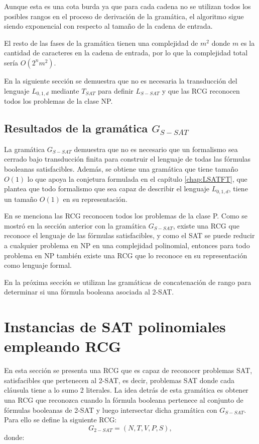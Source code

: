 \documentclass[12pt]{article}
\begin{document}
Aunque esta es una cota burda ya que para cada cadena no se utilizan todos los posibles rangos en el proceso de derivación de la gramática, el algoritmo sigue siendo exponencial con respecto al tamaño de la cadena de entrada.

El resto de las fases de la gramática tienen una complejidad de $m^2$ donde $m$
es la cantidad de caracteres en la cadena de entrada, por lo que la complejidad total sería $O(2^nm^2)$.

En la siguiente sección se demuestra que no es necesaria la transducción del lenguaje $L_{0,1,d}$ mediante $T_{SAT}$
para definir $L_{S-SAT}$ y que las RCG reconocen todos los problemas de la clase NP.
\subsection{Resultados de la gramática $G_{S-SAT}$}

La gramática $G_{S-SAT}$ demuestra que no es necesario que un formalismo sea cerrado bajo transducción 
finita para construir el lenguaje de todas las fórmulas booleanas satisfacibles. Además, se obtiene una 
gramática que tiene tamaño $O(1)$ lo que apoya la conjetura formulada en el capítulo \ref{chap:LSATFT}, 
que plantea que todo formalismo que sea capaz de describir el lenguaje $L_{0,1,d}$, tiene un tamaño $O(1)$ en su representación.

En \cite{propertiesRCGBib2} se menciona las RCG reconocen todos los problemas de la clase P. Como se mostró en la sección anterior con la gramática $G_{S-SAT}$, existe una RCG que reconoce el lenguaje de las fórmulas satisfacibles, y como el SAT se puede reducir a cualquier problema en NP en una complejidad polinomial, entonces para todo problema en NP también existe una RCG que lo reconoce en su representación como lenguaje formal.

En la próxima sección se utilizan las gramáticas de concatenación de rango para determinar si una fórmula booleana asociada al 2-SAT.

\section{Instancias de SAT polinomiales empleando RCG}
\label{sec:pSATRCG}

En esta sección se presenta una RCG que es capaz de reconocer problemas SAT, satisfacibles que pertenecen al 2-SAT, es decir, problemas SAT donde cada cláusula tiene a lo sumo 2 literales. La idea detrás de esta gramática es obtener una RCG que reconozca cuando la fórmula booleana pertenece al conjunto de fórmulas booleanas de 2-SAT y luego intersectar dicha gramática con $G_{S-SAT}$.  Para ello se define la siguiente RCG:
\[
    G_{2-SAT} = (N, T, V, P, S),
\]
donde:
\end{document}
